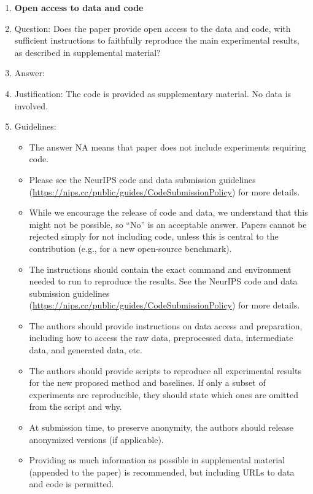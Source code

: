\documentclass{article}
\theoremstyle{plain}
\theoremstyle{definition}
\begin{document}
\begin{enumerate}
\item {\bf Open access to data and code}
    \item[] Question: Does the paper provide open access to the data and code, with sufficient instructions to faithfully reproduce the main experimental results, as described in supplemental material?
    \item[] Answer: \answerYes{}
    \item[] Justification: The code is provided as supplementary material. No data is involved.
    \item[] Guidelines:
    \begin{itemize}
        \item The answer NA means that paper does not include experiments requiring code.
        \item Please see the NeurIPS code and data submission guidelines (\url{https://nips.cc/public/guides/CodeSubmissionPolicy}) for more details.
        \item While we encourage the release of code and data, we understand that this might not be possible, so “No” is an acceptable answer. Papers cannot be rejected simply for not including code, unless this is central to the contribution (e.g., for a new open-source benchmark).
        \item The instructions should contain the exact command and environment needed to run to reproduce the results. See the NeurIPS code and data submission guidelines (\url{https://nips.cc/public/guides/CodeSubmissionPolicy}) for more details.
        \item The authors should provide instructions on data access and preparation, including how to access the raw data, preprocessed data, intermediate data, and generated data, etc.
        \item The authors should provide scripts to reproduce all experimental results for the new proposed method and baselines. If only a subset of experiments are reproducible, they should state which ones are omitted from the script and why.
        \item At submission time, to preserve anonymity, the authors should release anonymized versions (if applicable).
        \item Providing as much information as possible in supplemental material (appended to the paper) is recommended, but including URLs to data and code is permitted.
    \end{itemize}



\end{enumerate}
\end{document}
